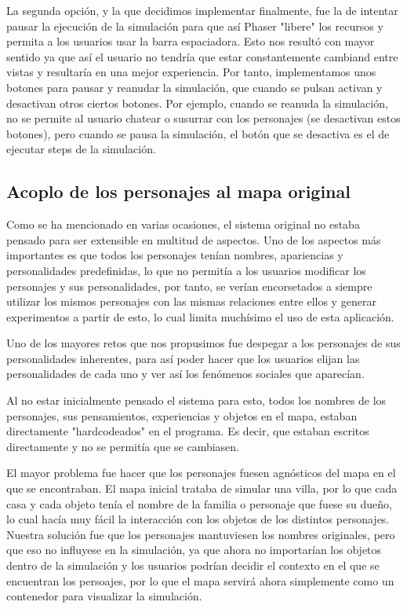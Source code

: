 La segunda opción, y la que decidimos implementar finalmente, fue la de intentar pausar la ejecución de la simulación para que así Phaser "libere" los recursos y permita a los usuarios usar la barra espaciadora. Esto nos resultó con mayor sentido ya que así el usuario no tendría que estar constantemente cambiand entre vistas y resultaría en una mejor experiencia. Por tanto, implementamos unos botones para pausar y reanudar la simulación, que cuando se pulsan activan y desactivan otros ciertos botones. Por ejemplo, cuando se reanuda la simulación, no se permite al usuario chatear o susurrar con los personajes (se desactivan estos botones), pero cuando se pausa la simulación, el botón que se desactiva es el de ejecutar steps de la simulación.

\subsection{Acoplo de los personajes al mapa original}
\label{problemaPersonajes}
Como se ha mencionado en varias ocasiones, el sistema original no estaba pensado para ser extensible en multitud de aspectos. Uno de los aspectos más importantes es que todos los personajes tenían nombres, apariencias y personalidades predefinidas, lo que no permitía a los usuarios modificar los personajes y sus personalidades, por tanto, se verían encorsetados a siempre utilizar los mismos personajes con las mismas relaciones entre ellos y generar experimentos a partir de esto, lo cual limita muchísimo el uso de esta aplicación.

Uno de los mayores retos que nos propusimos fue despegar a los personajes de sus personalidades inherentes, para así poder hacer que los usuarios elijan las personalidades de cada uno y ver así los fenómenos sociales que aparecían.

Al no estar inicialmente pensado el sistema para esto, todos los nombres de los personajes, sus pensamientos, experiencias y objetos en el mapa, estaban directamente "hardcodeados" en el programa. Es decir, que estaban escritos directamente y no se permitía que se cambiasen.

El mayor problema fue hacer que los personajes fuesen agnósticos del mapa en el que se encontraban. El mapa inicial trataba de simular una villa, por lo que cada casa y cada objeto tenía el nombre de la familia o personaje que fuese su dueño, lo cual hacía muy fácil la interacción con los objetos de los distintos personajes. Nuestra solución fue que los personajes mantuviesen los nombres originales, pero que eso no influyese en la simulación, ya que ahora no importarían los objetos dentro de la simulación y los usuarios podrían decidir el contexto en el que se encuentran los persoajes, por lo que el mapa servirá ahora simplemente como un contenedor para visualizar la simulación.

